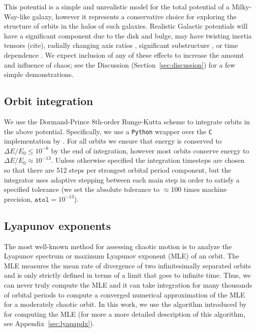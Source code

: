\documentclass[letterpaper,12pt,preprint]{aastex}
\begin{document}
This potential is a simple and unrealistic model for the total potential of a Milky-Way-like galaxy, however it represents a conservative choice for exploring the structure of orbits in the halos of such galaxies. Realistic Galactic potentials will have a significant component due to the disk and bulge, may have twisting inertia tensors (cite), radially changing axis ratios \citep[e.g.,][]{kazantzidis04,debattista08,veraciro11, NiHao}, significant substructure \citep{moore98,zemp09}, or time dependence \citep[either from bulk rotation, mass growth, mergers, etc.][]{bailin05}. We expect inclusion of any of these effects to increase the amount and influence of chaos; see the Discussion (Section~\ref{sec:discussion}) for a few simple demonstrations.

\subsection{Orbit integration}\label{sec:integration}

We use the Dormand-Prince 8th-order Runge-Kutta scheme \citep{prince81} to integrate orbits in the above potential. Specifically, we use a \texttt{Python} wrapper over the \texttt{C} implementation by \cite{hairer93}. For all orbits we ensure that energy is conserved to $\Delta E/E_0 \leq 10^{-8}$ by the end of integration, however most orbits conserve energy to $\Delta E/E_0 \approx 10^{-13}$. Unless otherwise specified the integration timesteps are chosen so that there are 512 steps per strongest orbital period component, but the integrator uses adaptive stepping between each main step in order to satisfy a specified tolerance (we set the absolute tolerance to $\approx$100 times machine precision, $\texttt{atol} = 10^{-13}$). 

\subsection{Lyapunov exponents} \label{sec:lyap}

The most well-known method for assessing chaotic motion is to analyze the Lyapunov spectrum or maximum Lyapunov exponent (MLE) of an orbit. The MLE measures the mean rate of divergence of two infinitesimally separated orbits and is only strictly defined in terms of a limit that goes to infinite time. Thus, we can never truly compute the MLE and it can take integration for many thousands of orbital periods to compute a converged numerical approximation of the MLE for a moderately chaotic orbit. In this work, we use the algorithm introduced by \cite{wolf85} for computing the MLE (for more a more detailed description of this algorithm, see Appendix~\ref{sec:lyapapdx}).
\end{document}
